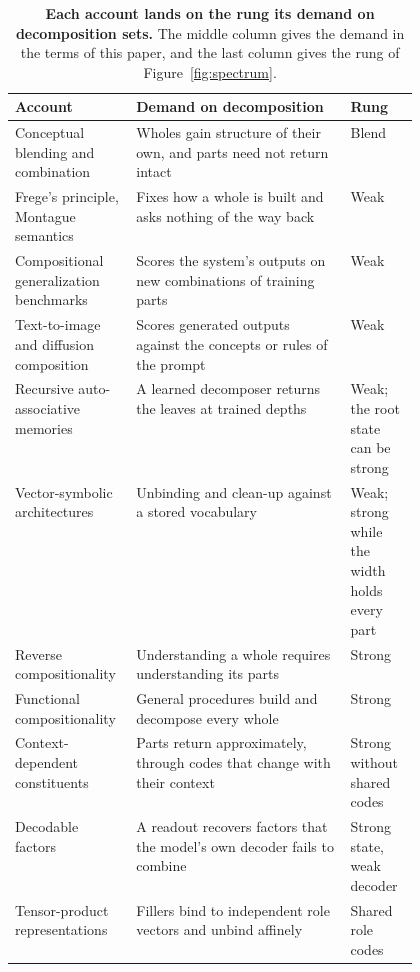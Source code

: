 \begin{table}[t]
  \caption{\textbf{Each account lands on the rung its demand on decomposition sets.} The middle column gives the demand in the terms of this paper, and the last column gives the rung of Figure~\ref{fig:spectrum}.}
  \label{tab:spectrum}
  \centering\small
  \begin{tabularx}{\linewidth}{@{}P{0.30\linewidth}YP{0.17\linewidth}@{}}
    \toprule
    Account & Demand on decomposition & Rung \\
    \midrule
    Conceptual blending and combination \citep{fauconnier2002,osherson1981,kamp1995} & Wholes gain structure of their own, and parts need not return intact & Blend \\
    \addlinespace
    Frege's principle, Montague semantics \citep{frege1923,montague1970} & Fixes how a whole is built and asks nothing of the way back & Weak \\
    Compositional generalization benchmarks \citep{lake2018,keysers2020,hupkes2020,lake2023} & Scores the system's outputs on new combinations of training parts & Weak \\
    Text-to-image and diffusion composition \citep{ramesh2021,okawa2023,favero2025diffusion} & Scores generated outputs against the concepts or rules of the prompt & Weak \\
    Recursive auto-associative memories \citep{pollack1990} & A learned decomposer returns the leaves at trained depths & Weak; the root state can be strong \\
    Vector-symbolic architectures \citep{plate1995,gayler2006,kanerva2009} & Unbinding and clean-up against a stored vocabulary & Weak; strong while the width holds every part \\
    \addlinespace
    Reverse compositionality \citep{fodor2002} & Understanding a whole requires understanding its parts & Strong \\
    Functional compositionality \citep{vangelder1990} & General procedures build and decompose every whole & Strong \\
    Context-dependent constituents \citep{smolensky1988} & Parts return approximately, through codes that change with their context & Strong without shared codes \\
    Decodable factors \citep{montero2021} & A readout recovers factors that the model's own decoder fails to combine & Strong state, weak decoder \\
    \addlinespace
    Tensor-product representations \citep{smolensky1990} & Fillers bind to independent role vectors and unbind affinely & Shared role codes \\

\end{tabularx}
\end{table}
